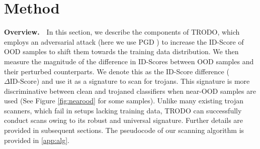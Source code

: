 

\section{Method}


\textbf{Overview.}\ \ In this section, we describe the components of TRODO, which employs an adversarial attack (here we use PGD \cite{pgd}) to increase the ID-Score of OOD samples to shift them towards the training data distribution. We then measure the magnitude of the difference in ID-Scores between OOD samples and their perturbed counterparts. We denote this as the ID-Score difference ($\Delta \text{ID-Score}$) and use it as a signature to scan for trojans. This signature is more discriminative between clean and trojaned classifiers when near-OOD samples are used (See Figure \ref{fig:nearood} for some samples). Unlike many existing trojan scanners, which fail in setups lacking training data, TRODO can successfully conduct scans owing to its robust and universal signature. Further details are provided in subsequent sections. The pseudocode of our scanning algorithm is provided in \ref{app:alg}. 

